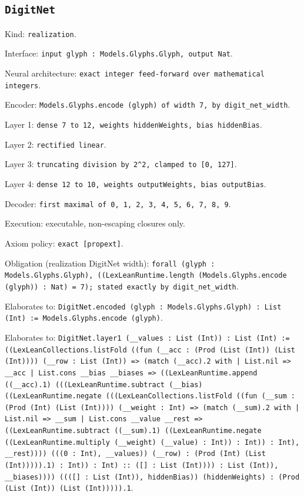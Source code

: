 \documentclass[11pt]{article}
\begin{document}
\subsection*{\texttt{DigitNet}}
\noindent Kind: \texttt{realization}.\par
\noindent Interface: \texttt{input glyph : Models.Glyphs.Glyph, output Nat}.\par
\noindent Neural architecture: \texttt{exact integer feed-forward over mathematical integers}.\par
\noindent Encoder: \texttt{Models.Glyphs.encode (glyph) of width 7, by digit\_net\_width}.\par
\noindent Layer 1: \texttt{dense 7 to 12, weights hiddenWeights, bias hiddenBias}.\par
\noindent Layer 2: \texttt{rectified linear}.\par
\noindent Layer 3: \texttt{truncating division by 2\^{}2, clamped to [0, 127]}.\par
\noindent Layer 4: \texttt{dense 12 to 10, weights outputWeights, bias outputBias}.\par
\noindent Decoder: \texttt{first maximal of 0, 1, 2, 3, 4, 5, 6, 7, 8, 9}.\par
\noindent Execution: executable, non-escaping closures only.\par
\noindent Axiom policy: \texttt{exact [propext]}.\par
\noindent Obligation (realization DigitNet width): \texttt{forall (glyph : Models.Glyphs.Glyph), ((LexLeanRuntime.length (Models.Glyphs.encode (glyph)) : Nat) = 7); stated exactly by digit\_net\_width}.\par
\noindent Elaborates to: \texttt{DigitNet.encoded (glyph : Models.Glyphs.Glyph) : List (Int) := Models.Glyphs.encode (glyph)}.\par
\noindent Elaborates to: \texttt{DigitNet.layer1 (\_\_values : List (Int)) : List (Int) := ((LexLeanCollections.listFold ((fun (\_\_acc : (Prod (List (Int)) (List (Int)))) (\_\_row : List (Int)) => (match (\_\_acc).2 with | List.nil => \_\_acc | List.cons \_\_bias \_\_biases => ((LexLeanRuntime.append ((\_\_acc).1) (((LexLeanRuntime.subtract (\_\_bias) ((LexLeanRuntime.negate (((LexLeanCollections.listFold ((fun (\_\_sum : (Prod (Int) (List (Int)))) (\_\_weight : Int) => (match (\_\_sum).2 with | List.nil => \_\_sum | List.cons \_\_value \_\_rest => ((LexLeanRuntime.subtract ((\_\_sum).1) ((LexLeanRuntime.negate ((LexLeanRuntime.multiply (\_\_weight) (\_\_value) : Int)) : Int)) : Int), \_\_rest)))) (((0 : Int), \_\_values)) (\_\_row) : (Prod (Int) (List (Int))))).1) : Int)) : Int) :: ([] : List (Int)))) : List (Int)), \_\_biases)))) ((([] : List (Int)), hiddenBias)) (hiddenWeights) : (Prod (List (Int)) (List (Int))))).1}.\par
\end{document}
